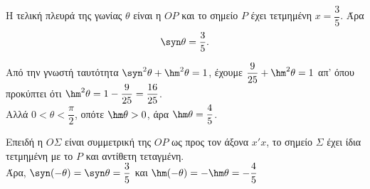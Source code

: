 \begin{alist}
\item Η τελική πλευρά της γωνίας $\theta$ είναι η $OP$ και το σημείο $P$ έχει τετμημένη $x = \dfrac{3}{5}$. Άρα \[\syn \theta = \frac{3}{5}.\]
\item Από την γνωστή ταυτότητα $\syn ^2\theta + \hm ^2\theta = 1$, έχουμε $\dfrac{9}{25} + \hm ^2\theta = 1$ απ' όπου προκύπτει ότι $\hm ^2\theta = 1 - \dfrac{9}{25} = \dfrac{16}{25}$. \\
Αλλά $0 < \theta < \dfrac{\pi}{2}$, οπότε $\hm \theta > 0$, άρα $\hm \theta = \dfrac{4}{5}$.
\item Επειδή η $O\Sigma$ είναι συμμετρική της $OP$ ως προς τον άξονα $x'x$, το σημείο $\Sigma$ έχει ίδια τετμημένη με το $P$ και αντίθετη τεταγμένη. \\
Άρα, $\syn (-\theta) = \syn \theta = \dfrac{3}{5}$ και $\hm (-\theta) = -\hm \theta = -\dfrac{4}{5}$
\end{alist}

